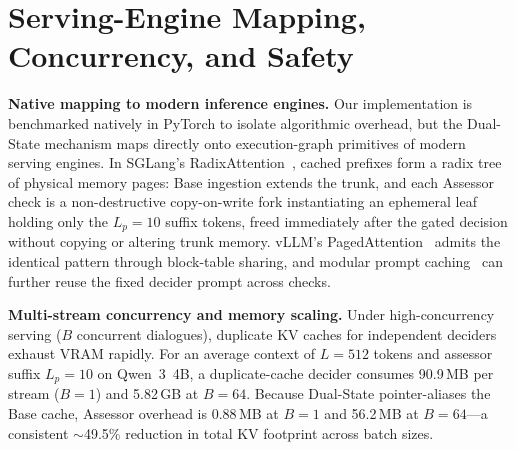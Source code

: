 \documentclass{article}
\begin{document}
\begin{table}[h]
\centering
\caption{\textbf{Auxiliary lightweight probing vs.\ Dual-State assessor (Qwen 3 4B).}}
\label{tab:probe_comparison}
\vspace{0.2cm}
\end{table}

\section{Serving-Engine Mapping, Concurrency, and Safety}
\label{app:serving}

\textbf{Native mapping to modern inference engines.} Our implementation is benchmarked natively in PyTorch to isolate algorithmic overhead, but the Dual-State mechanism maps directly onto execution-graph primitives of modern serving engines. In SGLang's RadixAttention~\citep{zheng2023sglang}, cached prefixes form a radix tree of physical memory pages: Base ingestion extends the trunk, and each Assessor check is a non-destructive copy-on-write fork instantiating an ephemeral leaf holding only the $L_p = 10$ suffix tokens, freed immediately after the gated decision without copying or altering trunk memory. vLLM's PagedAttention~\citep{kwon2023vllm} admits the identical pattern through block-table sharing, and modular prompt caching~\citep{gim2024promptcache} can further reuse the fixed decider prompt across checks.

\textbf{Multi-stream concurrency and memory scaling.} Under high-concurrency serving ($B$ concurrent dialogues), duplicate KV caches for independent deciders exhaust VRAM rapidly. For an average context of $L = 512$ tokens and assessor suffix $L_p = 10$ on Qwen~3~4B, a duplicate-cache decider consumes 90.9\,MB per stream ($B=1$) and 5.82\,GB at $B = 64$. Because Dual-State pointer-aliases the Base cache, Assessor overhead is 0.88\,MB at $B=1$ and 56.2\,MB at $B=64$---a consistent $\sim$49.5\% reduction in total KV footprint across batch sizes.
\end{document}
